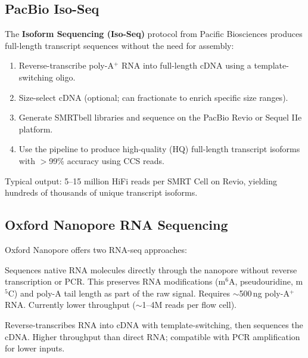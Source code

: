 \subsection{PacBio Iso-Seq}

The \textbf{Isoform Sequencing (Iso-Seq)} protocol from Pacific Biosciences
produces full-length transcript sequences without the need for assembly:

\begin{enumerate}[nosep]
  \item Reverse-transcribe poly-A$^+$ RNA into full-length cDNA using a
    template-switching oligo.
  \item Size-select cDNA (optional; can fractionate to enrich specific size
    ranges).
  \item Generate SMRTbell libraries and sequence on the PacBio Revio or Sequel
    IIe platform.
  \item Use the  pipeline to produce high-quality (HQ)
    full-length transcript isoforms with $>$99\% accuracy using CCS reads.
\end{enumerate}

Typical output: 5--15 million HiFi reads per SMRT Cell on Revio, yielding
hundreds of thousands of unique transcript isoforms.

\subsection{Oxford Nanopore RNA Sequencing}

Oxford Nanopore offers two RNA-seq approaches:

\begin{description}[style=nextline]
  \item[Direct RNA sequencing (RNA004)] Sequences native RNA molecules directly
    through the nanopore without reverse transcription or PCR. This preserves
    RNA modifications (m$^6$A, pseudouridine, m$^5$C) and poly-A tail length
    as part of the raw signal. Requires $\sim$500\,ng poly-A$^+$ RNA.
    Currently lower throughput ($\sim$1--4M reads per flow cell).
  \item[cDNA sequencing (SQK-PCS114)] Reverse-transcribes RNA into cDNA with
    template-switching, then sequences the cDNA. Higher throughput than direct
    RNA; compatible with PCR amplification for lower inputs.
\end{description}

